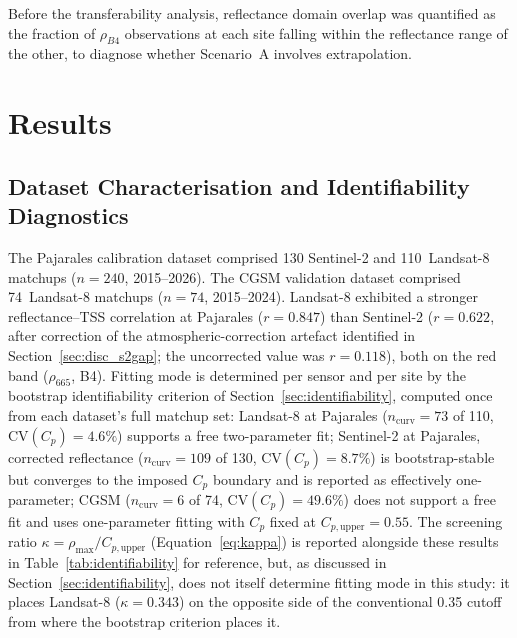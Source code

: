 \documentclass[remotesensing,article,submit,pdftex,moreauthors]{Definitions/mdpi}
\begin{document}
Before the transferability analysis, reflectance domain overlap was
quantified as the fraction of $\rho_{B4}$ observations at each site
falling within the reflectance range of the other, to diagnose whether
Scenario~A involves extrapolation.

\section{Results}

\subsection{Dataset Characterisation and Identifiability Diagnostics}
\label{sec:sensitivity}
The Pajarales calibration dataset comprised 130 Sentinel-2 and
110~Landsat-8 matchups ($n = 240$, 2015--2026). The CGSM validation
dataset comprised 74~Landsat-8 matchups ($n = 74$, 2015--2024).
Landsat-8 exhibited a stronger reflectance--TSS
correlation at Pajarales ($r = 0.847$) than Sentinel-2 ($r = 0.622$,
after correction of the atmospheric-correction artefact identified in
Section~\ref{sec:disc_s2gap}; the uncorrected value was $r = 0.118$),
both on the red band ($\rho_{665}$, B4). Fitting mode is determined per
sensor and per site by the bootstrap identifiability criterion of
Section~\ref{sec:identifiability}, computed once from each dataset's
full matchup set: Landsat-8 at Pajarales ($n_{\text{curv}}=73$ of 110,
$\mathrm{CV}(C_p)=4.6\%$) supports a free two-parameter fit;
Sentinel-2 at Pajarales, corrected reflectance ($n_{\text{curv}}=109$
of 130, $\mathrm{CV}(C_p)=8.7\%$) is bootstrap-stable but converges to
the imposed $C_p$ boundary and is reported as effectively
one-parameter; CGSM ($n_{\text{curv}}=6$ of 74,
$\mathrm{CV}(C_p)=49.6\%$) does not support a free fit and uses
one-parameter fitting with $C_p$ fixed at $C_{p,\text{upper}}=0.55$.
The screening ratio $\kappa = \rho_{\max}/C_{p,\text{upper}}$
(Equation~\ref{eq:kappa}) is reported alongside these results in
Table~\ref{tab:identifiability} for reference, but, as discussed in
Section~\ref{sec:identifiability}, does not itself determine fitting
mode in this study: it places Landsat-8 ($\kappa=0.343$) on the
opposite side of the conventional 0.35 cutoff from where the bootstrap
criterion places it.
 
\end{document}
